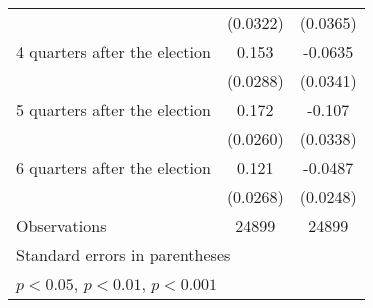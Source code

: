\begin{table}[htbp]
\begin{tabular}{l*{2}{c}}
                    &    (0.0322)         &    (0.0365)         \\
[1em]
 4 quarters after the election&       0.153\sym{***}&     -0.0635         \\
                    &    (0.0288)         &    (0.0341)         \\
[1em]
 5 quarters after the election&       0.172\sym{***}&      -0.107\sym{**} \\
                    &    (0.0260)         &    (0.0338)         \\
[1em]
 6 quarters after the election&       0.121\sym{***}&     -0.0487\sym{*}  \\
                    &    (0.0268)         &    (0.0248)         \\
\hline
Observations        &       24899         &       24899         \\
\hline\hline
\multicolumn{3}{l}{\footnotesize Standard errors in parentheses}\\
\multicolumn{3}{l}{\footnotesize \sym{*} \(p<0.05\), \sym{**} \(p<0.01\), \sym{***} \(p<0.001\)}\\
\end{tabular}
\end{table}
